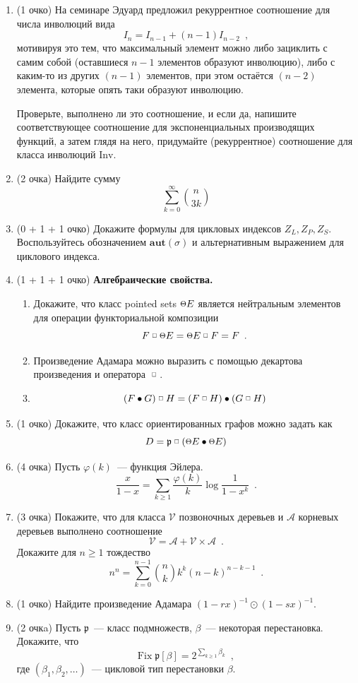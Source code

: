 \documentclass[a5paper]{article}
\def \fprod {\; \raisebox{.3\height}{\scalebox{0.6}{$\square$}}\; }
\def \point {\raisebox{.1\height}{\scalebox{0.8}{$\Theta$}}}
\theoremstyle{definition}
\begin{document}
\begin{enumerate}
	\item(1 очко) На семинаре Эдуард предложил рекуррентное 
	соотношение для числа инволюций вида
	\[
		I_{n} = I_{n-1} + (n-1)I_{n-2} \enspace ,
	\]
	мотивируя это тем, 
	что 
	максимальный элемент можно либо зациклить с самим собой (оставшиеся \( n-1 
	\) 
	элементов образуют инволюцию), либо с каким-то из других \( (n-1) \) 
	элементов, 
	при этом остаётся \( (n-2) \) элемента, которые опять таки образуют 
	инволюцию.
	
	Проверьте, выполнено ли это соотношение, и если да, напишите 
	соответствующее 
	соотношение для экспоненциальных производящих функций, а затем глядя на 
	него, 
	придумайте (рекуррентное) соотношение для класса инволюций \( \mathrm{Inv} 
	\).
    \item(2 очка) Найдите сумму 
    \[
        \sum_{k = 0}^{\infty} {n \choose 3k}
    \]

	\item(0 + 1 + 1 очко) Докажите формулы для цикловых индексов \( Z_L, Z_P,
Z_S \). Воспользуйтесь обозначением \( \mathbf{aut}(\sigma) \) и альтернативным
выражением для циклового индекса.
	\item(1 + 1 + 1 очко) \textbf{Алгебраические свойства.}
        \begin{enumerate}
        \item	Докажите, что класс pointed sets \( \point E \) является 
        нейтральным элементов для операции функториальной композиции
        \[
            F \fprod \point E = \point E \fprod F = F \enspace .
        \]
        \item Произведение Адамара можно выразить с помощью декартова произведения 
        и оператора \( \fprod \).
        \item 
\[
	(F \bullet G) \fprod H = (F \fprod H) \bullet (G \fprod H)
\]
        \end{enumerate}
	\item(1 очко) Докажите, что класс ориентированных графов можно задать как 
	\[
		D = \mathfrak p \fprod (\point E \bullet \point E)
	\]
    \item(4 очка) Пусть \( \varphi(k) \)~--- функция Эйлера.
\[
    \dfrac{x}{1-x} = \sum_{k \geq 1} \dfrac{\varphi(k)}{k} \log \dfrac{1}{1 -
x^k} \enspace.
\]
	\item(3 очка) Покажите, что для класса \( \mathcal V \) позвоночных деревьев
и \( \mathcal A \) корневых деревьев выполнено соотношение
\[
    \mathcal V = \mathcal A + \mathcal V \times \mathcal A \enspace .
\]
Докажите для \( n \geq 1 \) тождество 
\[
    n^n = \sum_{k = 0}^{n-1} {n \choose k} k^k (n-k)^{n-k-1} \enspace .
\]
    \item(1 очко) Найдите произведение Адамара \( (1 - rx)^{-1} \odot (1 - sx)^{-1}\).
    \item(2 очкa) Пусть \( \mathfrak p \)~--- класс подмножеств, \( \beta\)~---
некоторая перестановка. Докажите, что
    \[
    \mathrm{Fix}\; \mathfrak p [\beta] = 2^{\sum_{k \geq 1} \beta_k} \enspace ,
    \]
где $(\beta_1, \beta_2, \ldots)$~--- цикловой тип перестановки \( \beta \).
\end{enumerate}

\footnotesize


    
\end{document}

